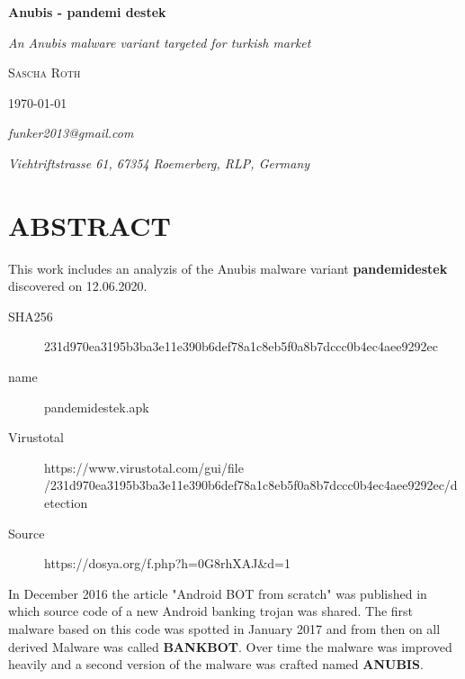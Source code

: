 \documentclass[10pt,titlepage]{article}
\begin{document}
\begin{titlepage}

\centering

\vspace*{1cm}
	\vspace{2cm}
	\vspace{1.5cm}
	{\huge\bfseries Anubis - pandemi destek\par}
	\vspace{1.5cm}
	{\Large\itshape An Anubis malware variant targeted for turkish market\par}
	\vspace{2cm}
	{\Large\scshape Sascha Roth\par}
	\vfill
	\vfill


	{\large \today\par}
	\vspace{2cm}
	{\itshape funker2013@gmail.com\par}
	{\itshape Viehtriftstrasse 61, 67354 Roemerberg, RLP, Germany\par}
\end{titlepage}

\setcounter{page}{1}

\section{ABSTRACT}
This work includes an analyzis of the Anubis malware variant \textbf{pandemidestek} discovered on 12.06.2020.

\begin{description}
\item[SHA256] 231d970ea3195b3ba3e11e390b6def78a1c8eb5f0a8b7dccc0b4ec4aee9292ec
\item[name] pandemidestek.apk
\item[Virustotal] https://www.virustotal.com/gui/file
\\ /231d970ea3195b3ba3e11e390b6def78a1c8eb5f0a8b7dccc0b4ec4aee9292ec/detection
\item[Source] https://dosya.org/f.php?h=0G8rhXAJ\&d=1
\end{description}

In December 2016 the article "Android BOT from scratch" was published in which source code of a new Android banking trojan was shared. The first malware based on this code was spotted in January 2017 and from then on all derived Malware was called \textbf{BANKBOT}. Over time the malware was improved heavily and a second version of the malware was crafted named \textbf{ANUBIS}.\cite{ALLSTARTEDWITHBANKBOT} \cite{ANUBISTRENDMICRO}
\end{document}
